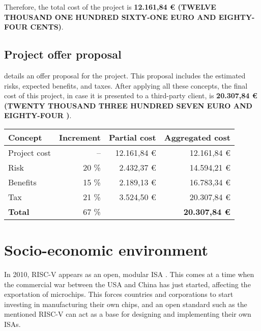 Therefore, the total cost of the project is \textbf{12.161,84 € (TWELVE THOUSAND ONE HUNDRED SIXTY-ONE EURO AND EIGHTY-FOUR CENTS)}.


\subsection{Project offer proposal}\label{subsec:offer-proposal}
 details an offer proposal for the project. This proposal includes the estimated risks, expected benefits, and taxes. After applying all these concepts, the final cost of this project, in case it is presented to a third-party client, is \textbf{20.307,84 € (TWENTY THOUSAND THREE HUNDRED SEVEN EURO AND EIGHTY-FOUR )}.

\begin{table}[htb]
    {
      \begin{tabular}{lrrr}
        \toprule
        \textbf{Concept} & \textbf{Increment} & \textbf{Partial cost} & \textbf{Aggregated cost} \\
        \midrule
        Project cost   & --    & 12.161,84 € & 12.161,84 € \\
        Risk           & 20 \% &  2.432,37 € & 14.594,21 € \\
        Benefits       & 15 \% &  2.189,13 € & 16.783,34 € \\
        Tax            & 21 \% &  3.524,50 € & 20.307,84 € \\
        \midrule
        \textbf{Total} & 67 \% & & \textbf{20.307,84 €} \\
        \bottomrule
      \end{tabular}
    }
\end{table}



\section{Socio-economic environment}\label{sec:environment}

In 2010, RISC-V appears as an open, modular \gls{ISA} \parencite{riscvOrigin}. This comes at a time when the commercial war between the USA and China has just started, affecting the exportation of microchips. This forces countries and corporations to start investing in manufacturing their own chips, and an open standard such as the mentioned RISC-V can act as a base for designing and implementing their own \glspl{ISA}.

